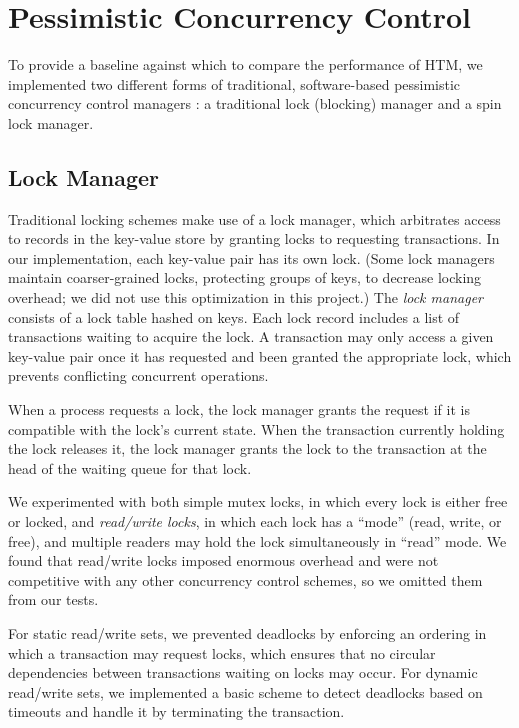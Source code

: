 \section{Pessimistic Concurrency Control} \label{sec:pessimistic}

To provide a baseline against which to compare the performance of HTM, we
implemented two different forms of traditional, software-based pessimistic
concurrency control managers : a traditional lock (blocking) manager 
and a spin lock manager.

\subsection{Lock Manager}

Traditional locking schemes make use of a lock manager, which arbitrates access
to records in the key-value store by granting locks to requesting transactions.
In our implementation, each key-value pair has its own lock. (Some lock managers
maintain coarser-grained locks, protecting groups of keys, to decrease locking
overhead; we did not use this optimization in this project.)
The \textit{lock manager} consists of a lock table hashed on keys. Each lock record
includes a list of transactions waiting to acquire the lock. A transaction may
only access a given key-value pair once it has requested and been granted the
appropriate lock, which prevents conflicting concurrent operations.

When a process requests a lock, the lock manager grants the request if it is
compatible with the lock's current state. When the transaction currently holding
the lock releases it, the lock manager grants the lock to the transaction at the
head of the waiting queue for that lock.

We experimented with both simple mutex locks, in which every lock is either free
or locked, and \textit{read/write locks}, in which each lock has a ``mode'' (read, write,
or free), and multiple readers may hold the lock simultaneously in ``read''
mode. We found that read/write locks imposed enormous overhead and were not
competitive with any other concurrency control schemes, so we omitted them from
our tests.

For static read/write sets, we prevented deadlocks by enforcing an ordering in
which a transaction may request locks, which ensures that no circular
dependencies between transactions waiting on locks may occur. For dynamic
read/write sets, we implemented a basic scheme to detect deadlocks
based on timeouts and handle it by terminating the transaction. \\

